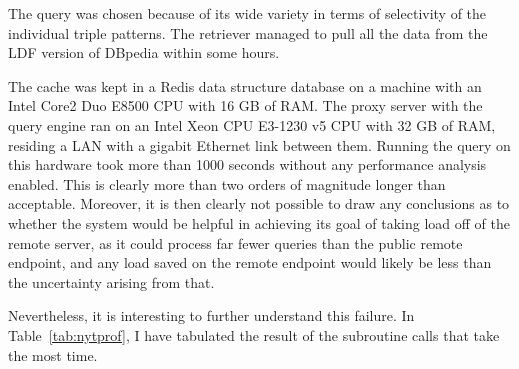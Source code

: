 The query was chosen because of its wide variety in terms of
selectivity of the individual triple patterns. The retriever managed
to pull all the data from the LDF version of DBpedia
within some hours. 

The cache was kept in a Redis data structure database on a machine
with an Intel Core2 Duo E8500 CPU with 16 GB of RAM. The proxy server
with the query engine ran on an Intel Xeon CPU E3-1230 v5 CPU with 32
GB of RAM, residing a LAN with a gigabit Ethernet link between
them. Running the query on this hardware took more than 1000 seconds
without any performance analysis enabled. This is clearly more than
two orders of magnitude longer than acceptable. Moreover, it is then
clearly not possible to draw any conclusions as to whether the system
would be helpful in achieving its goal of taking load off of the
remote server, as it could process far fewer queries than the public
remote endpoint, and any load saved on the remote endpoint would
likely be less than the uncertainty arising from that.

Nevertheless, it is interesting to further understand this failure. In
Table~\ref{tab:nytprof}, I have tabulated the result of the subroutine
calls that take the most time.

